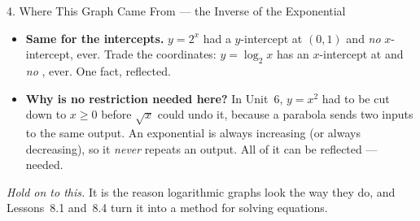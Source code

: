 \documentclass[10pt]{article}
\begin{document}
\begin{notesbox}{4. Where This Graph Came From --- the Inverse of the Exponential}
\begin{itemize}[leftmargin=1.5em, itemsep=3pt]
        logarithm's \emph{vertical} asymptote. It is the same boundary, seen sideways.
  \item \textbf{Same for the intercepts.} $y=2^x$ had a $y$-intercept at $(0,1)$ and \emph{no}
        $x$-intercept, ever. Trade the coordinates: $y=\log_2 x$ has an $x$-intercept at
        \blank{1.4cm} and \emph{no} \blank{2.0cm}, ever. One fact, reflected.
  \item \textbf{Why is no restriction needed here?} In Unit~6, $y=x^2$ had to be cut down to $x\ge0$
        before $\sqrt{x}$ could undo it, because a parabola sends two inputs to the same output. An
        exponential is always increasing (or always decreasing), so it \emph{never} repeats an
        output. All of it can be reflected --- \blank{4.4cm} needed.
\end{itemize}
\emph{Hold on to this.} It is the reason logarithmic graphs look the way they do, and Lessons~8.1
and~8.4 turn it into a method for solving equations.
\end{notesbox}
\end{document}
